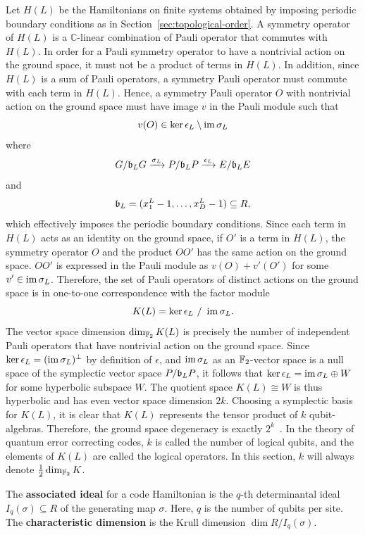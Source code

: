 Let $H(L)$ be the Hamiltonians on finite systems
obtained by imposing periodic boundary conditions 
as in Section~\ref{sec:topological-order}.
A symmetry operator of $H(L)$ is 
a $\mathbb{C}$-linear combination of Pauli operator that commutes with $H(L)$.
In order for a Pauli symmetry operator
to have a nontrivial action on the ground space,
it must not be a product of terms in $H(L)$.
In addition, since $H(L)$ is a sum of Pauli operators,
a symmetry Pauli operator must commute with each term in $H(L)$.
Hence, a symmetry Pauli operator $O$ with nontrivial action on the ground space
must have image $v$ in the Pauli module such that
\[
 v(O) \in \ker \epsilon_L \setminus \mathop{\mathrm{im}}\nolimits \sigma_L
\]
where
\[
 G / \mathfrak{b}_L G \xrightarrow{ \sigma_L } P / \mathfrak{b}_L P \xrightarrow{ \epsilon_L } E / \mathfrak{b}_L E 
\]
and
\[
 \mathfrak{b}_L = (x^L_1 -1,\ldots, x^L_D -1) \subseteq R, 
\]
which effectively imposes the periodic boundary conditions.
Since each term in $H(L)$ acts as an identity on the ground space,
if $O'$ is a term in $H(L)$, the symmetry operator $O$ and the product $OO'$
has the same action on the ground space. 
$OO'$ is expressed in the Pauli module as $v(O) + v'(O')$ for some $v' \in \mathop{\mathrm{im}}\nolimits \sigma_L$.
Therefore, the set of Pauli operators of distinct actions on the ground space is
in one-to-one correspondence with the factor module
\[
 K(L) = \ker \epsilon_L ~/~ \mathop{\mathrm{im}}\nolimits \sigma_L .
\] %
The vector space dimension $\dim_{\mathbb{F}_2} K(L)$ is precisely
the number of independent Pauli operators that have nontrivial action on the ground space.
%
Since $\ker \epsilon_L = (\mathop{\mathrm{im}}\nolimits \sigma_L)^\perp$ by definition of $\epsilon$,
and $\mathop{\mathrm{im}}\nolimits \sigma_L$ as an $\mathbb{F}_2$-vector space is a null space of the symplectic vector space $P/\mathfrak{b}_L P$,
it follows that $\ker \epsilon_L = \mathop{\mathrm{im}}\nolimits \sigma_L \oplus W$ for some hyperbolic subspace $W$.
The quotient space $K(L) \cong W$ is thus hyperbolic and has even vector space dimension $2k$.
Choosing a symplectic basis for $K(L)$, 
it is clear that $K(L)$ represents the tensor product of $k$ qubit-algebras.
Therefore, the ground space degeneracy is exactly $2^k$~\cite{Gottesman1996Saturating,CalderbankRainsShorEtAl1997Quantum}.
In the theory of quantum error correcting codes,
$k$ is called the number of logical qubits,
and the elements of $K(L)$ are called the logical operators.
In this section, $k$ will always denote $\frac{1}{2} \dim_{\mathbb{F}_2} K$.

\begin{defn}
The {\bf associated ideal} for a code Hamiltonian
is the $q$-th determinantal ideal $I_q(\sigma) \subseteq R$
of the generating map $\sigma$.
Here, $q$ is the number of qubits per site.
The {\bf characteristic dimension} is the Krull dimension $\dim R / I_q(\sigma)$.
\end{defn}


